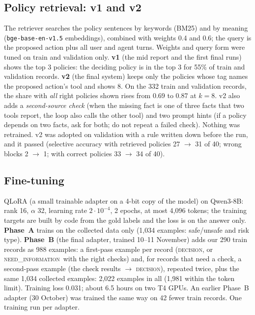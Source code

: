 \documentclass[10pt]{article}
\newcommand{\NEED}{\textsc{need\_information}}
\begin{document}
\subsection{Policy retrieval: v1 and v2}\label{sec:v2}
The retriever searches the policy sentences by keywords (BM25) and by meaning (\texttt{bge-base-en-v1.5}
embeddings), combined with weights 0.4 and 0.6; the query is the proposed action plus all user and agent
turns. Weights and query form were tuned on train and validation only. \textbf{v1} (the mid report and the
first final runs) shows the top 3 policies: the deciding policy is in the top 3 for 55\% of train and
validation records. \textbf{v2} (the final system) keeps only the policies whose tag names the proposed
action's tool and shows 8. On the 332 train and validation records, the share with \emph{all} right policies
shown rises from 0.69 to 0.87 at $k=8$. v2 also adds a \emph{second-source check} (when the missing fact is
one of three facts that two tools report, the loop also calls the other tool) and two prompt hints (if a
policy depends on two facts, ask for both; do not repeat a failed check). Nothing was retrained. v2 was
adopted on validation with a rule written down before the run, and it passed (selective accuracy with
retrieved policies 27 $\rightarrow$ 31 of 40; wrong blocks 2 $\rightarrow$ 1; with correct policies 33
$\rightarrow$ 34 of 40).

\subsection{Fine-tuning}
QLoRA (a small trainable adapter on a 4-bit copy of the model) on Qwen3-8B: rank 16, $\alpha$ 32, learning
rate $2\cdot10^{-4}$, 2 epochs, at most 4,096 tokens; the training targets are built by code from the gold
labels and the loss is on the answer only. \textbf{Phase~A} trains on the collected data only (1,034
examples: safe/unsafe and risk type). \textbf{Phase~B} (the final adapter, trained 10--11 November) adds our
290 train records as 988 examples: a first-pass example per record (\textsc{decision}, or \NEED\ with the
right checks) and, for records that need a check, a second-pass example (the check results $\rightarrow$
\textsc{decision}), repeated twice, plus the same 1,034 collected examples: 2,022 examples in all (1,981
within the token limit). Training loss 0.031; about 6.5 hours on two T4 GPUs. An earlier Phase~B adapter
(30 October) was trained the same way on 42 fewer train records. One training run per adapter.
\end{document}
